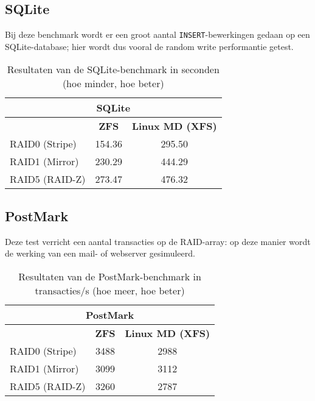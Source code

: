 \subsection{SQLite}

Bij deze benchmark wordt er een groot aantal \texttt{INSERT}-bewerkingen gedaan op een SQLite-database; hier wordt dus vooral de random write performantie getest.

\begin{table}[h]
  \centering
  \begin{tabular}{l || c | c }
    \hline
    \multicolumn{3}{c}{\textbf{SQLite}} \\
    \hline
    & \textbf{ZFS} & \textbf{Linux MD (XFS)} \\
    \hline
    RAID0 (Stripe) & 154.36 & 295.50 \\
    RAID1 (Mirror) & 230.29 & 444.29 \\
    RAID5 (RAID-Z) & 273.47 & 476.32 \\
  \end{tabular}
  \caption{Resultaten van de SQLite-benchmark in seconden (hoe minder, hoe beter)}
  \label{tab:results_sqlite}
\end{table}

\subsection{PostMark}

Deze test verricht een aantal transacties op de RAID-array: op deze manier wordt de werking van een mail- of webserver gesimuleerd.

\begin{table}[h]
  \centering
  \begin{tabular}{l || c | c }
    \hline
    \multicolumn{3}{c}{\textbf{PostMark}} \\
    \hline
    & \textbf{ZFS} & \textbf{Linux MD (XFS)} \\
    \hline
    RAID0 (Stripe) & 3488 & 2988 \\
    RAID1 (Mirror) & 3099 & 3112 \\
    RAID5 (RAID-Z) & 3260 & 2787 \\
  \end{tabular}
  \caption{Resultaten van de PostMark-benchmark in transacties/s (hoe meer, hoe beter)}
  \label{tab:results_postmark}
\end{table}


